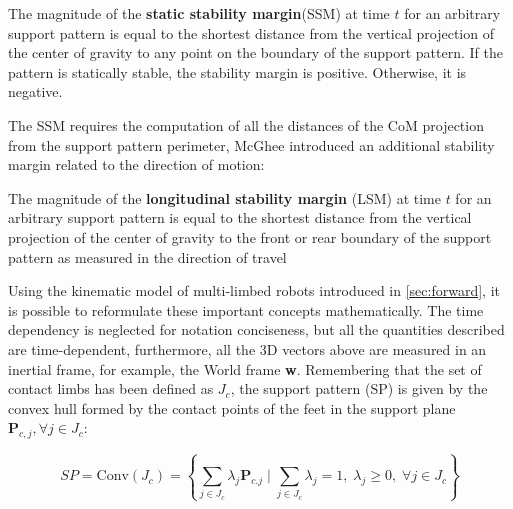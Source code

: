 \newpage
\begin{definition}\label{def:static_stability_margin}
\cite{McGhee}The magnitude of the \textbf{static stability margin}(SSM) at time $t$ for an arbitrary support pattern is equal to the shortest distance from the vertical projection of the center of gravity to any point on the boundary of the support pattern. If the pattern is statically stable, the stability margin is positive. Otherwise, it is negative.
\end{definition}

The SSM requires the computation of all the distances of the CoM projection from the support pattern perimeter, McGhee introduced an additional stability margin related to the direction of motion\cite{McGheeRoughLocomotion}:
\begin{definition}\label{def:static_stability_margin}
The magnitude of the \textbf{longitudinal stability margin} (LSM) at time $t$ for an arbitrary support pattern is equal to the shortest distance from the vertical projection of the center of gravity to the front or rear boundary of the support pattern as measured in the direction of travel 
\end{definition}

Using the kinematic model of multi-limbed robots introduced in \ref{sec:forward}, it is possible to reformulate these important concepts mathematically. 
The time dependency is neglected for notation conciseness, but all the quantities described are time-dependent, furthermore, all the 3D vectors above are measured in an inertial frame, for example, the World frame \textbf{w}. 
Remembering that the set of contact limbs has been defined as $J_c$, the support pattern (SP) is given by the convex hull formed by the contact points of the feet in the support plane $\mathbf{P}_{c,j},\forall j \in J_c$:

\begin{equation}
\label{eq:SP}
    SP = \text{Conv}(J_c) = \left\{ \sum_{j \in J_c} \lambda_j \mathbf{P}_{c.j} \;\Bigg|\; \sum_{j \in J_c} \lambda_j = 1, \; \lambda_j \geq 0, \; \forall j \in J_c \right\}
\end{equation}


